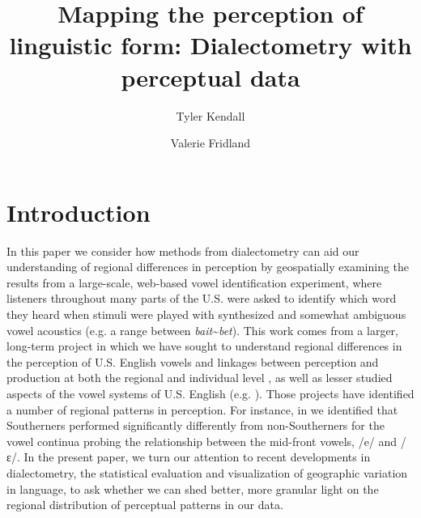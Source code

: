 \documentclass[output=paper]{LSP/langsci}
\author{Tyler Kendall\affiliation{University of Oregon}\and Valerie Fridland\affiliation{University of Nevada, Reno}}
\title{Mapping the perception of linguistic form: Dialectometry with perceptual data}
\begin{document}
 

% 
% 
% 
% 
 
\section{Introduction}
In this paper we consider how methods from dialectometry can aid our understanding of regional differences in perception by geospatially examining the results from a large-scale, web-based vowel identification experiment, where listeners throughout many parts of the U.S. were asked to identify which word they heard when stimuli were played with synthesized and somewhat ambiguous vowel acoustics (e.g. a range between \textit{bait}{\textasciitilde}\textit{bet}). This work comes from a larger, long-term project in which we have sought to understand regional differences in the perception of U.S. English vowels and linkages between perception and production at both the regional and individual level \citep{fridland_exploring_2012,kendall_mapping_2010,kendall_variation_2012}, as well as lesser studied aspects of the vowel systems of U.S. English (e.g. \citealt{fridland_durational_2014}). Those projects have identified a number of regional patterns in perception. For instance, in \cite{kendall_variation_2012} we identified that Southerners performed significantly differently from non-Southerners for the vowel continua probing the relationship between the mid-front vowels, /e/ and /ɛ/. In the present paper, we turn our attention to recent developments in dialectometry, the statistical evaluation and visualization of geographic variation in language, to ask whether we can shed better, more granular light on the regional distribution of perceptual patterns in our data. 
\end{document}
